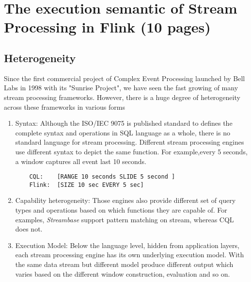 
\chapter{The execution semantic of Stream Processing in Flink (10 pages)}

\ifpdf
    \graphicspath{{Chapter3/Figs/Raster/}{Chapter3/Figs/PDF/}{Chapter3/Figs/}}
\else
    \graphicspath{{Chapter3/Figs/Vector/}{Chapter3/Figs/}}
\fi

\section{Heterogeneity}
Since the first commercial project of Complex Event Processing launched by Bell Labs in 1998 with its "Sunrise Project", we have seen the fast growing of many stream processing frameworks. However, there is a huge degree of heterogeneity across these frameworks in various forms\citep{Dindar:2013}

\begin{enumerate}

	\item Syntax: Although the ISO/IEC 9075 is published standard to defines the complete syntax and operations in SQL language as a whole, there is no standard language for stream processing. Different stream processing engines use different syntax to depict the same function. For example,every 5 seconds, a window captures all event last 10 seconds. 
	\begin{verbatim}
	CQL: 	[RANGE 10 seconds SLIDE 5 second ] 
	Flink: 	[SIZE 10 sec EVERY 5 sec]
	\end{verbatim}
	
	\item Capability heterogeneity:
	Those engines also provide different set of query types and operations based on which functions they are capable of. For examples, \textit{Streambase} support pattern matching on stream, whereas CQL does not.
	
	\item Execution Model: Below the language level, hidden from application layers, each stream processing engine has its own underlying execution model. With the same data stream but different model produce different output which varies based on the different window construction, evaluation and so on.
	
	
\end{enumerate}


